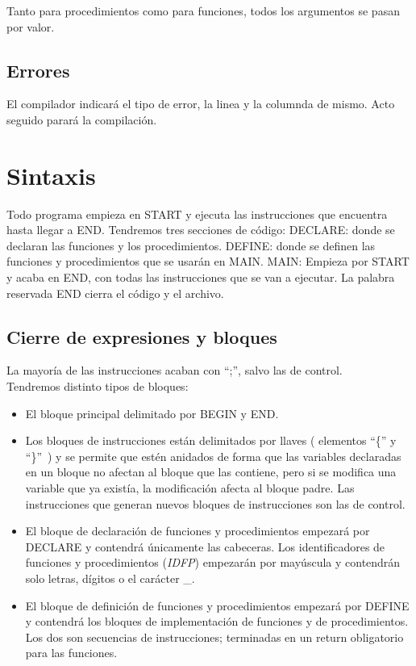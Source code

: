 \documentclass[a4paper, 12pt]{article}
\begin{document}
Tanto para procedimientos como para funciones, todos los argumentos se pasan por valor.

\subsection{Errores}
El compilador indicará el tipo de error, la linea y la columnda de mismo. Acto seguido parará la compilación.

\section{Sintaxis}

Todo programa empieza en START y ejecuta las instrucciones que encuentra hasta llegar a END. Tendremos tres secciones de código: DECLARE: donde se declaran las funciones y los procedimientos. DEFINE: donde se definen las funciones y procedimientos que se usarán en MAIN. MAIN: Empieza por START y acaba en END, con todas las instrucciones que se van a ejecutar. La palabra reservada END cierra el código y el archivo.

\subsection{Cierre de expresiones y bloques}
La mayoría de las instrucciones acaban con ``;'', salvo las de control.\\
Tendremos distinto tipos de bloques:
\begin{itemize}
\item El bloque principal delimitado por BEGIN y END.
\item Los bloques de instrucciones están delimitados por llaves ( elementos ``\{'' y ``\}''\ ) y se permite que estén anidados de forma que las variables declaradas en un bloque no afectan al bloque que las contiene, pero si se modifica una variable que ya existía, la modificación afecta al bloque padre. Las instrucciones que generan nuevos bloques de instrucciones son las de control.
\item El bloque de declaración de funciones y procedimientos empezará por DECLARE y contendrá únicamente las cabeceras. Los identificadores de funciones y procedimientos (\textit{IDFP}) empezarán por mayúscula y contendrán solo letras, dígitos o el carácter \_.

\item El bloque de definición de funciones y procedimientos empezará por DEFINE y contendrá los bloques de implementación de funciones y de procedimientos. Los dos son secuencias de instrucciones; terminadas en un return obligatorio para las funciones.

\end{itemize}
\end{document}
